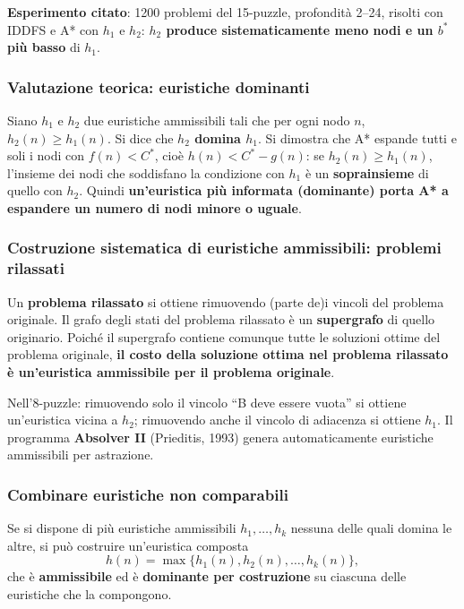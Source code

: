 \documentclass[11pt,a4paper]{report}
\begin{document}
\textbf{Esperimento citato}: 1200 problemi del 15-puzzle, profondità 2--24, risolti con IDDFS e A* con $h_1$ e $h_2$: \textbf{$h_2$ produce sistematicamente meno nodi e un $b^*$ più basso} di $h_1$.

\subsubsection*{Valutazione teorica: euristiche dominanti}

Siano $h_1$ e $h_2$ due euristiche ammissibili tali che per ogni nodo $n$, $h_2(n) \ge h_1(n)$. Si dice che \textbf{$h_2$ domina $h_1$}. Si dimostra che A* espande tutti e soli i nodi con $f(n) < C^*$, cioè $h(n) < C^*-g(n)$: se $h_2(n)\ge h_1(n)$, l'insieme dei nodi che soddisfano la condizione con $h_1$ è un \textbf{soprainsieme} di quello con $h_2$. Quindi \textbf{un'euristica più informata (dominante) porta A* a espandere un numero di nodi minore o uguale}.

\subsubsection*{Costruzione sistematica di euristiche ammissibili: problemi rilassati}

Un \textbf{problema rilassato} si ottiene rimuovendo (parte de)i vincoli del problema originale. Il grafo degli stati del problema rilassato è un \textbf{supergrafo} di quello originario. Poiché il supergrafo contiene comunque tutte le soluzioni ottime del problema originale, \textbf{il costo della soluzione ottima nel problema rilassato è un'euristica ammissibile per il problema originale}.

Nell'8-puzzle: rimuovendo solo il vincolo ``B deve essere vuota'' si ottiene un'euristica vicina a $h_2$; rimuovendo anche il vincolo di adiacenza si ottiene $h_1$. Il programma \textbf{Absolver II} (Prieditis, 1993) genera automaticamente euristiche ammissibili per astrazione.

\subsubsection*{Combinare euristiche non comparabili}

Se si dispone di più euristiche ammissibili $h_1,\dots,h_k$ nessuna delle quali domina le altre, si può costruire un'euristica composta
\[
h(n) = \max\{h_1(n), h_2(n), \dots, h_k(n)\},
\]
che è \textbf{ammissibile} ed è \textbf{dominante per costruzione} su ciascuna delle euristiche che la compongono.
\end{document}
